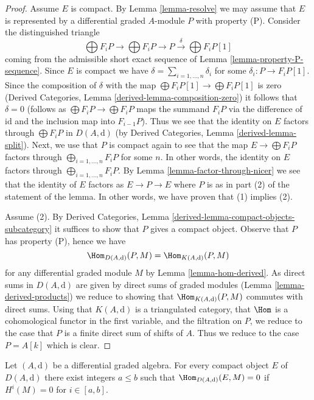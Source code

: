 \begin{proof}
Assume $E$ is compact. By Lemma \ref{lemma-resolve} we may assume that $E$
is represented by a differential graded $A$-module $P$ with property (P).
Consider the distinguished triangle
$$
\bigoplus F_iP \to \bigoplus F_iP \to P
\xrightarrow{\delta} \bigoplus F_iP[1]
$$
coming from the admissible short exact sequence of
Lemma \ref{lemma-property-P-sequence}. Since $E$ is compact we have
$\delta = \sum_{i = 1, \ldots, n} \delta_i$ for some
$\delta_i : P \to F_iP[1]$. Since the composition of $\delta$
with the map $\bigoplus F_iP[1] \to \bigoplus F_iP[1]$ is zero
(Derived Categories, Lemma \ref{derived-lemma-composition-zero})
it follows that $\delta = 0$ (follows as $\bigoplus F_iP \to \bigoplus F_iP$
maps the summand $F_iP$ via the difference of $\text{id}$ and the inclusion
map into $F_{i - 1}P$).
Thus we see that the identity on $E$ factors through
$\bigoplus F_iP$ in $D(A, \text{d})$ (by
Derived Categories, Lemma \ref{derived-lemma-split}).
Next, we use that $P$ is compact again to see that the map
$E \to \bigoplus F_iP$ factors through $\bigoplus_{i = 1, \ldots, n} F_iP$
for some $n$. In other words, the identity on $E$ factors through
$\bigoplus_{i = 1, \ldots, n} F_iP$. By
Lemma \ref{lemma-factor-through-nicer}
we see that the identity of $E$ factors as $E \to P \to E$
where $P$ is as in part (2) of the statement of the lemma.
In other words, we have proven that (1) implies (2).

\medskip\noindent
Assume (2). By
Derived Categories, Lemma \ref{derived-lemma-compact-objects-subcategory}
it suffices to show that $P$ gives a compact object. Observe that
$P$ has property (P), hence we have
$$
\Hom_{D(A, \text{d})}(P, M) = \Hom_{K(A, \text{d})}(P, M)
$$
for any differential graded module $M$ by Lemma \ref{lemma-hom-derived}.
As direct sums in $D(A, \text{d})$ are given by direct sums of
graded modules (Lemma \ref{lemma-derived-products}) we reduce
to showing that $\Hom_{K(A, \text{d})}(P, M)$ commutes with direct
sums. Using that $K(A, \text{d})$ is a triangulated category,
that $\Hom$ is a cohomological functor in the first
variable, and the filtration on $P$, we reduce to the case that
$P$ is a finite direct sum of shifts of $A$. Thus we reduce to
the case $P = A[k]$ which is clear.
\end{proof}

\begin{lemma}
\label{lemma-compact-implies-bounded}
Let $(A, \text{d})$ be a differential graded algebra.
For every compact object $E$ of $D(A, \text{d})$ there
exist integers $a \leq b$ such that $\Hom_{D(A, \text{d})}(E, M) = 0$
if $H^i(M) = 0$ for $i \in [a, b]$.
\end{lemma}

